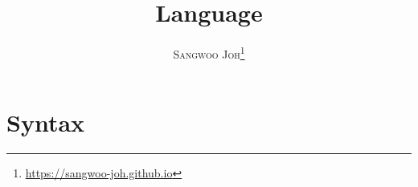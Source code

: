 \documentclass[12pt, a4paper, oneside]{book}
\title{
  \Huge \textbf{Language}
  \\
}
\author{\textsc{Sangwoo Joh}\footnote{\url{https://sangwoo-joh.github.io}}}
\begin{document}
\frontmatter
\maketitle

\tableofcontents  %
\listoffigures  %
\listoftables   %

\mainmatter



\section{Syntax}
\label{sec:syntax}
\end{document}
